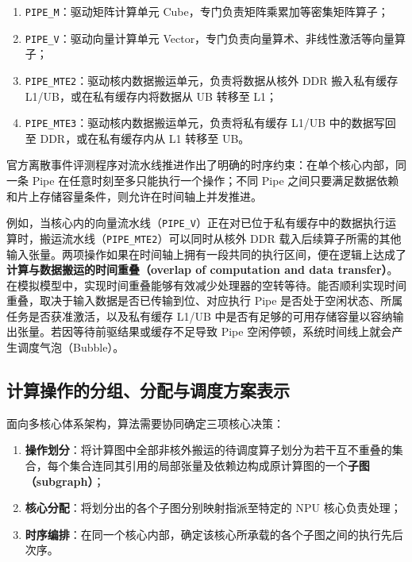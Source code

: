 \documentclass[anonymous,notoc]{gmcm2026}
\providecommand{\tightlist}{\setlength{\itemsep}{0pt}\setlength{\parskip}{0pt}}
\begin{document}
\begin{enumerate}
\def\labelenumi{\arabic{enumi}.}
\tightlist
\item
  \texttt{PIPE\_M}：驱动矩阵计算单元 Cube，专门负责矩阵乘累加等密集矩阵算子；
\item
  \texttt{PIPE\_V}：驱动向量计算单元 Vector，专门负责向量算术、非线性激活等向量算子；
\item
  \texttt{PIPE\_MTE2}：驱动核内数据搬运单元，负责将数据从核外 DDR 搬入私有缓存 L1/UB，或在私有缓存内将数据从 UB 转移至 L1；
\item
  \texttt{PIPE\_MTE3}：驱动核内数据搬运单元，负责将私有缓存 L1/UB 中的数据写回至 DDR，或在私有缓存内从 L1 转移至 UB。
\end{enumerate}

官方离散事件评测程序对流水线推进作出了明确的时序约束：在单个核心内部，同一条 Pipe 在任意时刻至多只能执行一个操作；不同 Pipe 之间只要满足数据依赖和片上存储容量条件，则允许在时间轴上并发推进。

例如，当核心内的向量流水线（\texttt{PIPE\_V}）正在对已位于私有缓存中的数据执行运算时，搬运流水线（\texttt{PIPE\_MTE2}）可以同时从核外 DDR 载入后续算子所需的其他输入张量。两项操作如果在时间轴上拥有一段共同的执行区间，便在逻辑上达成了\textbf{计算与数据搬运的时间重叠（overlap of computation and data transfer）}。在模拟模型中，实现时间重叠能够有效减少处理器的空转等待。能否顺利实现时间重叠，取决于输入数据是否已传输到位、对应执行 Pipe 是否处于空闲状态、所属任务是否获准激活，以及私有缓存 L1/UB 中是否有足够的可用存储容量以容纳输出张量。若因等待前驱结果或缓存不足导致 Pipe 空闲停顿，系统时间线上就会产生调度气泡（Bubble）。

\subsection{计算操作的分组、分配与调度方案表示}

面向多核心体系架构，算法需要协同确定三项核心决策：

\begin{enumerate}
\def\labelenumi{\arabic{enumi}.}
\tightlist
\item
  \textbf{操作划分}：将计算图中全部非核外搬运的待调度算子划分为若干互不重叠的集合，每个集合连同其引用的局部张量及依赖边构成原计算图的一个\textbf{子图（subgraph）}；
\item
  \textbf{核心分配}：将划分出的各个子图分别映射指派至特定的 NPU 核心负责处理；
\item
  \textbf{时序编排}：在同一个核心内部，确定该核心所承载的各个子图之间的执行先后次序。
\end{enumerate}
\end{document}

